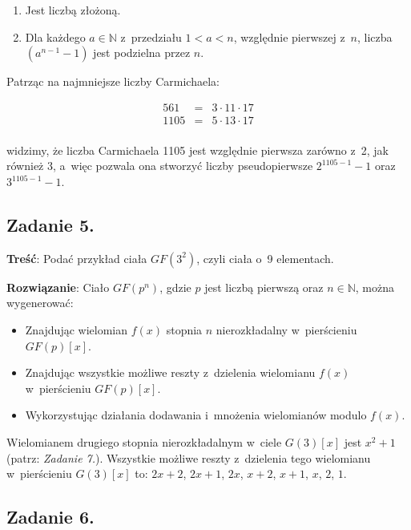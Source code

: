 \documentclass[a4paper,10pt, twocolumn]{article}
\begin{document}
\begin{enumerate}
 \item Jest liczbą złożoną.
 \item Dla każdego $a \in \mathbb{N}$ z~przedziału $1 < a < n$, względnie pierwszej z~$n$, liczba $(a^{n-1} - 1)$ jest podzielna przez $n$.
\end{enumerate}

Patrząc na najmniejsze liczby Carmichaela:

\begin{equation*}
	\begin{array}{lcl} 561& = & 3 \cdot 11 \cdot 17 \\ 1105 & = & 5 \cdot 13 \cdot 17 \\ \end{array}
\end{equation*}

\noindent widzimy, że liczba Carmichaela 1105 jest względnie pierwsza zarówno z~2, jak również 3, a~więc pozwala ona stworzyć liczby pseudopierwsze $2^{1105 - 1} - 1$ oraz $3^{1105 - 1} - 1$.

\subsection{Zadanie 5.}

\textbf{Treść}: Podać przykład ciała $GF(3^{2})$, czyli ciała o~9 elementach.

\textbf{Rozwiązanie}: Ciało $GF(p^{n})$, gdzie $p$ jest liczbą pierwszą oraz $n \in \mathbb{N}$, można wygenerować:

\begin{itemize}
 \item Znajdując wielomian $f(x)$ stopnia $n$ nierozkładalny w~pierścieniu $GF(p)[x]$.
 \item Znajdując wszystkie możliwe reszty z~dzielenia wielomianu $f(x)$ w~pierścieniu $GF(p)[x]$.
 \item Wykorzystując działania dodawania i~mnożenia wielomianów modulo $f(x)$.
\end{itemize}

Wielomianem drugiego stopnia nierozkładalnym w~ciele $G(3)[x]$ jest $x^2 + 1$ (patrz: \emph{Zadanie 7.}). Wszystkie możliwe reszty z~dzielenia tego wielomianu w~pierścieniu $G(3)[x]$ to: $2x + 2$, $2x + 1$, $2x$, $x + 2$, $x + 1$, $x$, $2$, $1$.

\subsection{Zadanie 6.}
\end{document}
